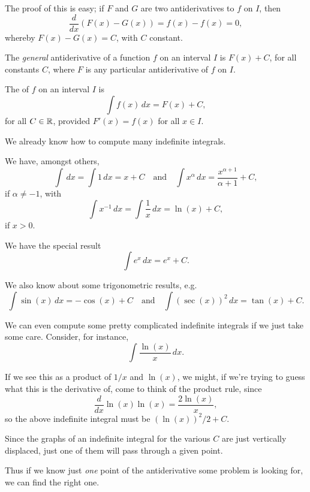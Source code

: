 The proof of this is easy; if $F$ and $G$ are two antiderivatives to $f$ on $I$, then
\[
	\frac{d}{d x} (F(x) - G(x)) = f(x) - f(x) = 0,
\]
whereby $F(x) - G(x) = C$, with $C$ constant.


The \emph{general} antiderivative of a function $f$ on an interval $I$ is $F(x) + C$, for all constants $C$, where $F$ is any particular antiderivative of $f$ on $I$.

\begin{definition}
	The  of $f$ on an interval $I$ is
	\[
		\int f(x) \, d x = F(x) + C,
	\]
	for all $C \in \mathbb{R}$, provided $F'(x) = f(x)$ for all $x \in I$.
\end{definition}

\noindent
We already know how to compute many indefinite integrals.

\begin{examples}
	We have, amongst others,
	\[
		\int \, d x = \int 1 \, d x = x + C \quad \text{and} \quad \int x^\alpha \, d x = \frac{x^{\alpha + 1}}{\alpha + 1} + C,
	\]
	if $\alpha \neq -1$, with
	\[
		\int x^{-1} \, d x = \int \frac{1}{x} \, d x = \ln(x) + C,
	\]
	if $x > 0$.

	We have the special result
	\[
		\int e^x \, d x = e^x + C.
	\]

	\noindent
	We also know about some trigonometric results, e.g.
	\[
		\int \sin(x) \, d x = - \cos(x) + C \quad \text{and} \quad \int (\sec(x))^2 \, d x = \tan(x) + C.
	\]

	\noindent
	We can even compute some pretty complicated indefinite integrals if we just take some care. Consider, for instance,
	\[
		\int \frac{\ln(x)}{x} \, d x.
	\]

	\noindent
	If we see this as a product of $1/x$ and $\ln(x)$, we might, if we're trying to guess what this is the derivative of, come to think of the product rule, since
	\[
		\frac{d}{d x} \ln(x) \ln(x) = \frac{2 \ln(x)}{x},
	\]
	so the above indefinite integral must be $(\ln(x))^2 / 2 + C$.
\end{examples}

\noindent
Since the graphs of an indefinite integral for the various $C$ are just vertically displaced, just one of them will pass through a given point.

Thus if we know just \emph{one} point of the antiderivative some problem is looking for, we can find the right one.

